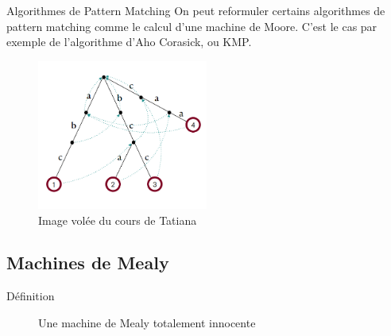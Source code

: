 \documentclass{beamer}
\begin{document}
\begin{frame}{Algorithmes de Pattern Matching}
    On peut reformuler certains algorithmes de pattern matching comme le calcul d'une machine de Moore.
    C'est le cas par exemple de l'algorithme d'Aho Corasick, ou KMP.

    \begin{figure}[h]
        \includegraphics[width = 0.5\textwidth]{Arbre Aho-Corasick.png}
        \\
        Image volée du cours de Tatiana
    \end{figure}
\end{frame}

\subsection{Machines de Mealy}

\begin{frame}{Définition}  
    \begin{figure}[h]
        \caption{Une machine de Mealy totalement innocente}
        \begin{center}
        \end{center}
    \end{figure}

\end{frame}
\end{document}
